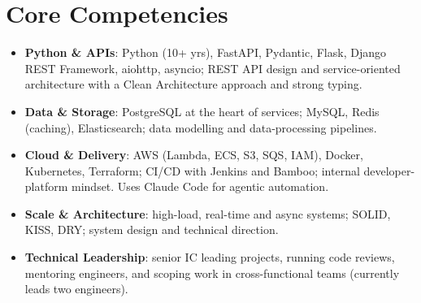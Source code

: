 \documentclass[11pt,a4paper,sans]{moderncv}
\begin{document}

\section{Core Competencies}
\vspace{1pt}
\begin{itemize}

\item \textbf{Python \& APIs}: Python (10+ yrs), FastAPI, Pydantic, Flask, Django REST Framework, aiohttp, asyncio; REST API design and service-oriented architecture with a Clean Architecture approach and strong typing.

\item \textbf{Data \& Storage}: PostgreSQL at the heart of services; MySQL, Redis (caching), Elasticsearch; data modelling and data-processing pipelines.

\item \textbf{Cloud \& Delivery}: AWS (Lambda, ECS, S3, SQS, IAM), Docker, Kubernetes, Terraform; CI/CD with Jenkins and Bamboo; internal developer-platform mindset. Uses Claude Code for agentic automation.

\item \textbf{Scale \& Architecture}: high-load, real-time and async systems; SOLID, KISS, DRY; system design and technical direction.

\item \textbf{Technical Leadership}: senior IC leading projects, running code reviews, mentoring engineers, and scoping work in cross-functional teams (currently leads two engineers).

\end{itemize}

\end{document}
